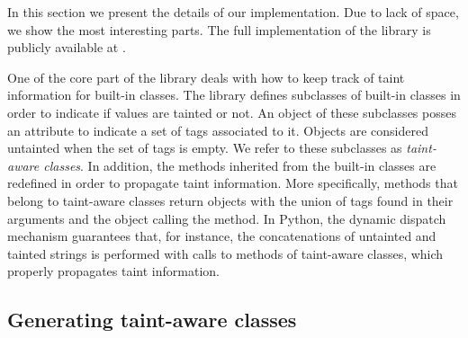 \documentclass[oribibl]{llncs}
\newcommand{\nametklass}{taint-aware }
\begin{document}
In this section we present the details of our implementation. Due to lack of
space, we show the most interesting parts.
The full
implementation of the library is publicly available at \cite{PythonLib}.


One of the core part of the library 
deals with how to keep track of taint information 
for built-in classes.
The library defines 
subclasses of built-in classes
in order to indicate if values are tainted or not.
An object of these subclasses posses an attribute to indicate a set 
of tags 
associated to it. 
Objects are considered untainted when the
set of tags is empty. 
We refer to these subclasses as
\emph{\nametklass classes}.
In addition, the methods inherited from the built-in classes 
are redefined in order to propagate taint information. 
More specifically, methods that belong to 
\nametklass classes return objects with  
the union of tags found in their arguments and 
the object calling the method. 
In Python, 
the dynamic dispatch 
mechanism guarantees that, for instance, 
the concatenations of untainted and tainted strings is performed 
with calls to methods of \nametklass classes, which properly   
propagates taint information. %

\subsection{Generating \nametklass classes}
\label{sec:general}
\end{document}
